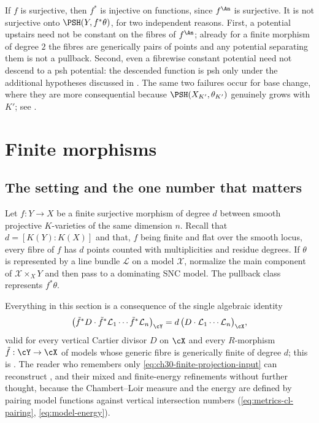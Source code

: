 \begin{remark}
\label{rem:ch30-pullback-not-onto}
If \(f\) is surjective, then \(f^*\) is injective on functions, since
\(f^{\An}\) is surjective.  It is not surjective onto
\(\PSH(Y,f^*\theta)\), for two independent reasons.  First, a potential
upstairs need not be constant on the fibres of \(f^{\An}\); already for a
finite morphism of degree \(2\) the fibres are generically pairs of points
and any potential separating them is not a pullback.  Second, even a
fibrewise constant potential need not descend to a psh potential: the
descended function is psh only under the additional hypotheses discussed in
.  The same two failures occur for base change,
where they are more consequential because \(\PSH(X_{K'},\theta_{K'})\)
genuinely grows with \(K'\); see .
\end{remark}

\section{Finite morphisms}
\label{sec:ch30-finite}

\subsection{The setting and the one number that matters}
\label{sec:ch30-finite-setting}

Let \(f:Y\to X\) be a finite surjective morphism of degree \(d\) between
smooth projective \(K\)-varieties of the same dimension \(n\).  Recall that
\(d=[K(Y):K(X)]\) and that, \(f\) being finite and flat over the smooth
locus, every fibre of \(f\) has \(d\) points counted with multiplicities and
residue degrees.  If \(\theta\) is represented by a line bundle
\(\mathcal L\) on a model \(\mathcal X\), normalize the main component of
\(\mathcal X\times_XY\) and then pass to a dominating SNC model.  The
pullback class represents \(f^*\theta\).

Everything in this section is a consequence of the single algebraic identity
\begin{equation}
\label{eq:ch30-finite-projection-input}
 \bigl(\tilde f^*D\cdot\tilde f^*\mathcal L_1\cdots
       \tilde f^*\mathcal L_n\bigr)_{\cY}
 =d\,\bigl(D\cdot\mathcal L_1\cdots\mathcal L_n\bigr)_{\cX},
\end{equation}
valid for every vertical Cartier divisor \(D\) on \(\cX\) and every
\(R\)-morphism \(\tilde f:\cY\to\cX\) of models whose generic fibre is
generically finite of degree \(d\); this is
.  The reader who remembers only
\eqref{eq:ch30-finite-projection-input} can reconstruct
,  and their
mixed and finite-energy refinements without further thought, because the
Chambert--Loir measure and the energy are defined by pairing model functions
against vertical intersection numbers
(\eqref{eq:metrics-cl-pairing}, \eqref{eq:model-energy}).

